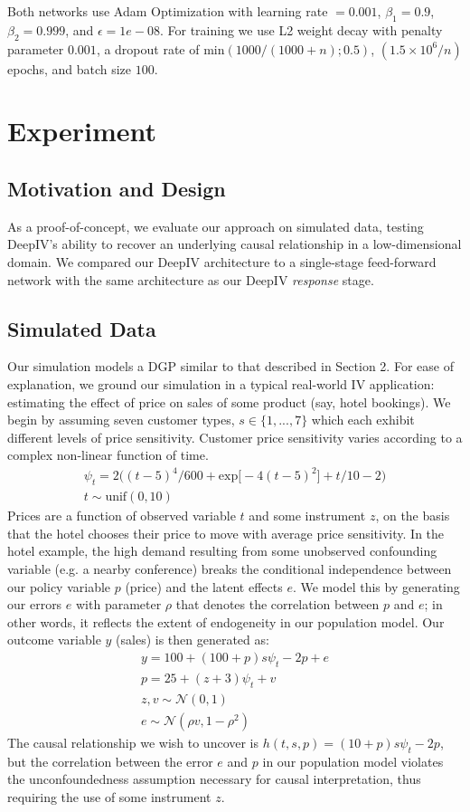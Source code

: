 \documentclass[11pt, oneside, twocolumn]{article}   	%
\begin{document}
Both networks use Adam Optimization with learning rate $=0.001$, $\beta_1 = 0.9$, $\beta_2 = 0.999$, and $\epsilon = 1e-08$. For training we use L2 weight decay with penalty parameter $0.001$, a dropout rate of $\textrm{min}(1000/(1000+n); 0.5)$, $(1.5 \times 10^6/n)$ epochs, and batch size $100$. 


\section{Experiment}
\subsection{Motivation and Design}
As a proof-of-concept, we evaluate our approach on simulated data, testing DeepIV's ability to recover an underlying causal relationship in a low-dimensional domain. We compared our DeepIV architecture to a single-stage feed-forward network with the same architecture as our  DeepIV \emph{response} stage. 

\subsection{Simulated Data}
Our simulation models a DGP similar to that described in Section 2. For ease of explanation, we ground our simulation in a typical real-world IV application: estimating the effect of price on sales of some product (say, hotel bookings). We begin by assuming seven customer types, $s \in \{1,...,7\}$ which each exhibit different levels of price sensitivity. Customer price sensitivity varies according to a complex non-linear function of time.
\begin{gather*}
\psi_t = 2\big((t-5)^4/600 + \textrm{exp}\big[-4(t-5)^2\big] + t/10 - 2 \big)\\
t \sim \textrm{unif}(0,10)
\end{gather*}
Prices are a function of observed variable $t$ and some instrument $z$, on the basis that the hotel chooses their price to move with average price sensitivity. In the hotel example, the high demand resulting from some unobserved confounding variable (e.g. a nearby conference) breaks the conditional independence between our policy variable $p$ (price) and the latent effects $e$. We model this by generating our errors $e$ with parameter $\rho$ that denotes the correlation between $p$ and $e$; in other words, it reflects the extent of endogeneity in our population model. Our outcome variable $y$ (sales) is then generated as:
\begin{gather*}
y = 100 + (100 + p)s\psi_t - 2p + e \\
p = 25 + (z + 3)\psi_t + v \\
z, v \sim \mathcal{N}(0,1) \\
e \sim \mathcal{N}(\rho v, 1 - \rho^2)
\end{gather*}
The causal relationship we wish to uncover is $h(t, s, p) = (10 + p)s\psi_t - 2p$, but the correlation between the error $e$ and $p$ in our population model violates the unconfoundedness assumption necessary for causal interpretation, thus requiring the use of some instrument $z$. \\
\end{document}
